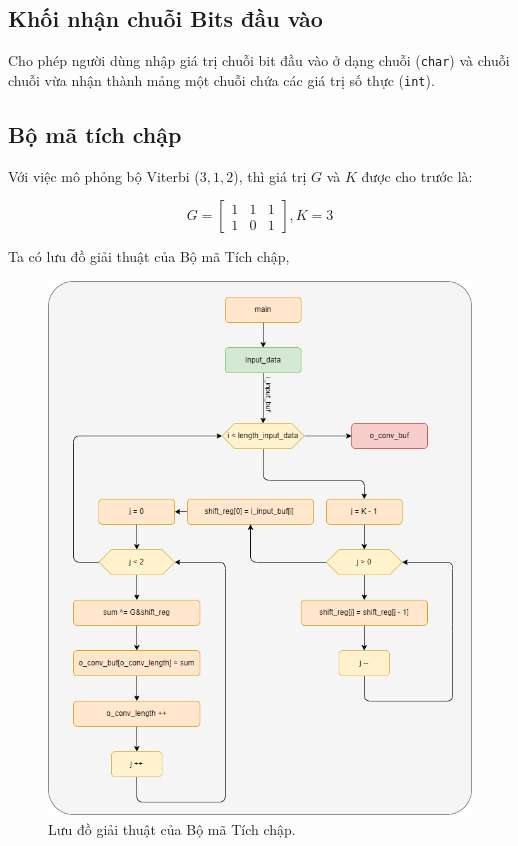 \subsection{Khối nhận chuỗi Bits đầu vào}

Cho phép người dùng nhập giá trị chuỗi bit đầu vào ở dạng chuỗi (\texttt{char}) và chuỗi chuỗi vừa nhận thành mảng một chuỗi chứa các giá trị số thực (\texttt{int}).


\subsection{Bộ mã tích chập}

Với việc mô phỏng bộ Viterbi ($3, 1, 2$), thì giá trị $G$ và $K$ được cho trước là:

\[
	G = \begin{bmatrix}
		1 & 1 & 1\\
		1 & 0 & 1
	\end{bmatrix}, K = 3
\]

Ta có lưu đồ giải thuật của Bộ mã Tích chập,

\begin{figure}[H]
	\centering
	\includegraphics[width=.8\linewidth]{sections/pic/mophongbangC/flowchart_conv_block_withC.png}
	\caption{Lưu đồ giải thuật của Bộ mã Tích chập.}
\end{figure}

